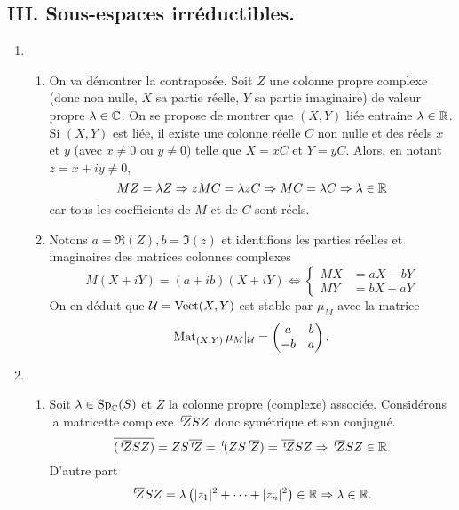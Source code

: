 \subsection*{III. Sous-espaces irréductibles.}
\begin{enumerate}
 \item
 \begin{enumerate}
 \item On va démontrer la contraposée. Soit $Z$ une colonne propre complexe (donc non nulle, $X$ sa partie réelle, $Y$ sa partie imaginaire) de valeur propre $\lambda \in \mathbb{C}$. On se propose de montrer que $(X,Y)$ liée entraine $\lambda \in \mathbb{R}$.\newline
 Si $(X,Y)$ est liée, il existe une colonne réelle $C$ non nulle et des réels $x$ et $y$ (avec $x\neq 0$ ou $y\neq 0$) telle que $X = x C$ et $Y = y C$. Alors, en notant $z = x + iy \neq 0$,
\[
 M Z = \lambda Z \Rightarrow z MC = \lambda z C \Rightarrow MC = \lambda C \Rightarrow \lambda \in \mathbb{R}
\]
car tous les coefficients de $M$ et de $C$ sont réels.

 \item Notons $a = \Re (Z), b = \Im(z)$ et identifions les parties réelles et imaginaires des matrices colonnes complexes
\[
 M(X + i Y) = (a+ib)(X+iY) \Leftrightarrow
 \left\lbrace 
 \begin{aligned}
  MX &= aX - bY \\MY &= bX + aY 
 \end{aligned}
\right. 
\]
On en déduit que $\mathcal{U} = \operatorname{Vect}(X,Y)$ est stable par $\mu_M$ avec la matrice
\[
 \operatorname{Mat}_{(X,Y)}\mu_M|_\mathcal{U} =
\begin{pmatrix}
 a & b \\ -b & a
\end{pmatrix}
.
\]

\end{enumerate}

 \item
 \begin{enumerate}
 \item Soit $\lambda \in \text{Sp}_{\mathbb{C}}(S)$ et $Z$ la colonne propre (complexe) associée. Considérons la matricette complexe $\,\mathstrut^t\!{\overline{Z}} S Z$ donc symétrique et son conjugué.
\[
 \overline{(\,\mathstrut^t\!{\overline{Z}} S Z)} = Z S \overline{\,\mathstrut^t\!{Z}} = \,\mathstrut^t\!{(Z S \,\mathstrut^t\!{\overline{Z}})} = \overline{\,\mathstrut^t\!{Z}} S Z
 \Rightarrow \,\mathstrut^t\!{\overline{Z}} S Z \in \mathbb{R}.
\]
D'autre part 
\[
 \,\mathstrut^t\!{\overline{Z}} S Z = \lambda \left( |z_1|^2 + \cdots + |z_n|^2\right)\in \mathbb{R} \Rightarrow \lambda \in \mathbb{R}.
\]


\end{enumerate}
\end{enumerate}
